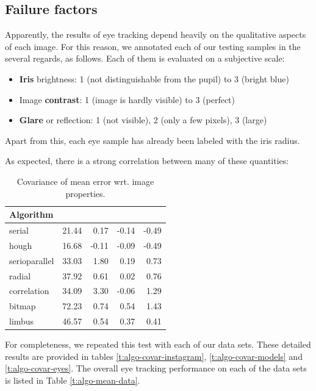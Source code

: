 \subsection{Failure factors}
\label{s:results-eyecovar}

Apparently, the results of eye tracking depend heavily on the qualitative aspects of each image.
For this reason, we annotated each of our testing samples in the several regards, as follows.
Each of them is evaluated on a subjective scale:
\begin{itemize}
\item \textbf{Iris} brightness:
1 (not distinguishable from the pupil) to 3 (bright blue)
\item Image \textbf{contrast}:
1 (image is hardly visible) to 3 (perfect)
\item \textbf{Glare} or reflection:
1 (not visible), 2 (only a few pixels), 3 (large)
\end{itemize}
Apart from this, each eye sample has already been labeled with the iris radius.

As expected, there is a strong correlation between many of these quantities:
\begin{table}[h!]
\centering
\begin{tabular}{l@{\hspace{1.5cm}}D{.}{.}{3.2}D{.}{.}{3.2}D{.}{.}{3.2}D{.}{.}{3.2}}
\toprule
\textbf{Algorithm} &  &  &  & \\
\midrule
serial & 21.44 & 0.17 & -0.14 & -0.49\\
hough & 16.68 & -0.11 & -0.09 & -0.49\\
serioparallel & 33.03 & 1.80 & 0.19 & 0.73\\
radial & 37.92 & 0.61 & 0.02 & 0.76\\
correlation & 34.09 & 3.30 & -0.06 & 1.29\\
bitmap & 72.23 & 0.74 & 0.54 & 1.43\\
limbus & 46.57 & 0.54 & 0.37 & 0.41\\
\bottomrule
\end{tabular}
\caption{Covariance of mean error wrt. image properties.}\label{t:algo-covar}
\end{table}

For completeness, we repeated this test with each of our data sets.
These detailed results are provided in tables \ref{t:algo-covar-instagram}, \ref{t:algo-covar-models} and \ref{t:algo-covar-eyes}.
The overall eye tracking performance on each of the data sets is listed in Table \ref{t:algo-mean-data}.

